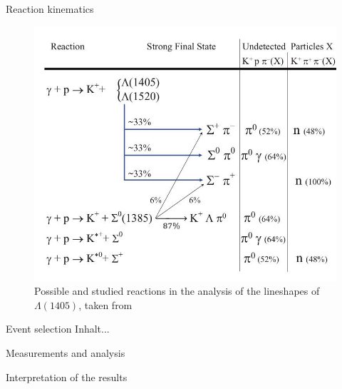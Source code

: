 \documentclass[11pt,aspectratio=1610,dvipsnames]{beamer}
\begin{document}
\begin{frame}{Reaction kinematics}
	\begin{figure}[H]
		\includegraphics[width=.65\linewidth]{kinematics}
		\caption{Possible and studied reactions in the analysis of the lineshapes of $\Lambda(1405)$, taken from \citet{lineshapes}}
	\end{figure}
\end{frame}

\begin{frame}{Event selection}
	Inhalt...
\end{frame}

\begin{frame}{Measurements and analysis}
	
\end{frame}

\begin{frame}{Interpretation of the results}
	
\end{frame}
\end{document}
